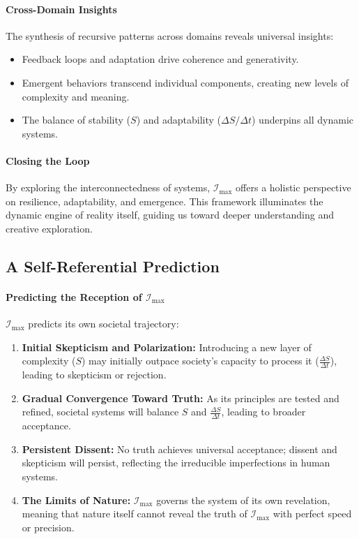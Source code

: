 \documentclass[12pt]{article}
\begin{document}
\paragraph{Cross-Domain Insights}
The synthesis of recursive patterns across domains reveals universal insights:
\begin{itemize}
    \item Feedback loops and adaptation drive coherence and generativity.
    \item Emergent behaviors transcend individual components, creating new levels of complexity and meaning.
    \item The balance of stability (\( S \)) and adaptability (\( \Delta S / \Delta t \)) underpins all dynamic systems.
\end{itemize}

\paragraph{Closing the Loop}
By exploring the interconnectedness of systems, \(\mathcal{I}_{\text{max}}\) offers a holistic perspective on resilience, adaptability, and emergence. This framework illuminates the dynamic engine of reality itself, guiding us toward deeper understanding and creative exploration.

\subsection{A Self-Referential Prediction}
\paragraph{Predicting the Reception of \(\mathcal{I}_{\text{max}}\)}
\(\mathcal{I}_{\text{max}}\) predicts its own societal trajectory:
\begin{enumerate}
    \item \textbf{Initial Skepticism and Polarization:} Introducing a new layer of complexity (\(S\)) may initially outpace society’s capacity to process it (\(\frac{\Delta S}{\Delta t}\)), leading to skepticism or rejection.
    \item \textbf{Gradual Convergence Toward Truth:} As its principles are tested and refined, societal systems will balance \(S\) and \(\frac{\Delta S}{\Delta t}\), leading to broader acceptance.
    \item \textbf{Persistent Dissent:} No truth achieves universal acceptance; dissent and skepticism will persist, reflecting the irreducible imperfections in human systems.
    \item \textbf{The Limits of Nature:} \(\mathcal{I}_{\text{max}}\) governs the system of its own revelation, meaning that nature itself cannot reveal the truth of \(\mathcal{I}_{\text{max}}\) with perfect speed or precision.
\end{enumerate}
\end{document}

